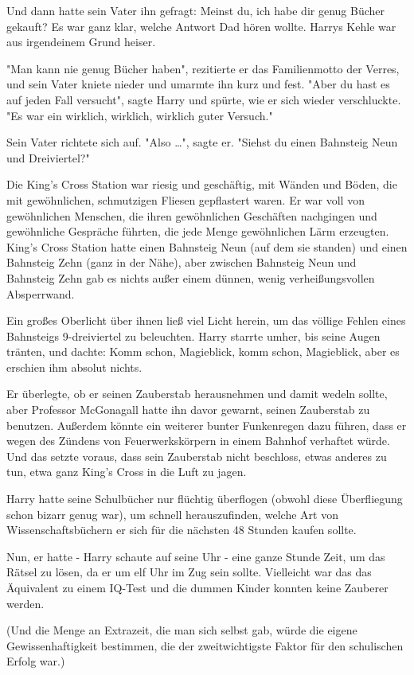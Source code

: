 {Und dann hatte sein Vater ihn gefragt: Meinst du, ich habe dir genug Bücher gekauft? Es war ganz klar, welche Antwort Dad hören wollte. Harrys Kehle war aus irgendeinem Grund heiser.

"Man kann nie genug Bücher haben", rezitierte er das Familienmotto der Verres, und sein Vater kniete nieder und umarmte ihn kurz und fest. "Aber du hast es auf jeden Fall versucht", sagte Harry und spürte, wie er sich wieder verschluckte. "Es war ein wirklich, wirklich, wirklich guter Versuch."

Sein Vater richtete sich auf. "Also …", sagte er. "Siehst du einen Bahnsteig Neun und Dreiviertel?"

Die King's Cross Station war riesig und geschäftig, mit Wänden und Böden, die mit gewöhnlichen, schmutzigen Fliesen gepflastert waren. Er war voll von gewöhnlichen Menschen, die ihren gewöhnlichen Geschäften nachgingen und gewöhnliche Gespräche führten, die jede Menge gewöhnlichen Lärm erzeugten. King's Cross Station hatte einen Bahnsteig Neun (auf dem sie standen) und einen Bahnsteig Zehn (ganz in der Nähe), aber zwischen Bahnsteig Neun und Bahnsteig Zehn gab es nichts außer einem dünnen, wenig verheißungsvollen Absperrwand.

Ein großes Oberlicht über ihnen ließ viel Licht herein, um das völlige Fehlen eines Bahnsteigs 9-dreiviertel zu beleuchten. Harry starrte umher, bis seine Augen tränten, und dachte: Komm schon, Magieblick, komm schon, Magieblick, aber es erschien ihm absolut nichts.

Er überlegte, ob er seinen Zauberstab herausnehmen und damit wedeln sollte, aber Professor McGonagall hatte ihn davor gewarnt, seinen Zauberstab zu benutzen. Außerdem könnte ein weiterer bunter Funkenregen dazu führen, dass er wegen des Zündens von Feuerwerkskörpern in einem Bahnhof verhaftet würde. Und das setzte voraus, dass sein Zauberstab nicht beschloss, etwas anderes zu tun, etwa ganz King's Cross in die Luft zu jagen.

Harry hatte seine Schulbücher nur flüchtig überflogen (obwohl diese Überfliegung schon bizarr genug war), um schnell herauszufinden, welche Art von Wissenschaftsbüchern er sich für die nächsten 48 Stunden kaufen sollte.

Nun, er hatte - Harry schaute auf seine Uhr - eine ganze Stunde Zeit, um das Rätsel zu lösen, da er um elf Uhr im Zug sein sollte. Vielleicht war das das Äquivalent zu einem IQ-Test und die dummen Kinder konnten keine Zauberer werden.

(Und die Menge an Extrazeit, die man sich selbst gab, würde die eigene Gewissenhaftigkeit bestimmen, die der zweitwichtigste Faktor für den schulischen Erfolg war.)

}
